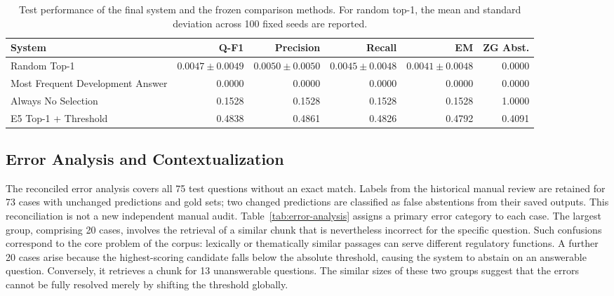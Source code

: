 \documentclass[11pt]{article}
\begin{document}
\begin{table}[t]
\centering
\small
\setlength{\tabcolsep}{3pt}
\begin{tabular}{lrrrrr}
\toprule
\textbf{System} & \textbf{Q-F1} & \textbf{Precision} & \textbf{Recall} & \textbf{EM} & \textbf{ZG Abst.} \\
\midrule
Random Top-1 & $0.0047\pm0.0049$ & $0.0050\pm0.0050$ & $0.0045\pm0.0048$ & $0.0041\pm0.0048$ & 0.0000 \\
Most Frequent Development Answer & 0.0000 & 0.0000 & 0.0000 & 0.0000 & 0.0000 \\
Always No Selection & 0.1528 & 0.1528 & 0.1528 & 0.1528 & 1.0000 \\
E5 Top-1 + Threshold & 0.4838 & 0.4861 & 0.4826 & 0.4792 & 0.4091 \\
\bottomrule
\end{tabular}
\caption{Test performance of the final system and the frozen comparison methods. For random top-1, the mean and standard deviation across 100 fixed seeds are reported.}
\label{tab:baselines}
\end{table}

\subsection{Error Analysis and Contextualization}

The reconciled error analysis covers all 75 test questions without an exact match. Labels from the historical manual review are retained for 73 cases with unchanged predictions and gold sets; two changed predictions are classified as false abstentions from their saved outputs. This reconciliation is not a new independent manual audit. Table~\ref{tab:error-analysis} assigns a primary error category to each case. The largest group, comprising 20 cases, involves the retrieval of a similar chunk that is nevertheless incorrect for the specific question. Such confusions correspond to the core problem of the corpus: lexically or thematically similar passages can serve different regulatory functions. A further 20 cases arise because the highest-scoring candidate falls below the absolute threshold, causing the system to abstain on an answerable question. Conversely, it retrieves a chunk for 13 unanswerable questions. The similar sizes of these two groups suggest that the errors cannot be fully resolved merely by shifting the threshold globally.
\end{document}
